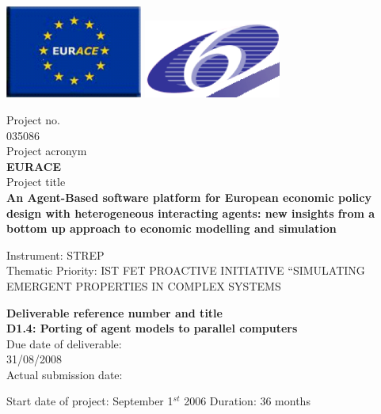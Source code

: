 \documentclass[a4paper,11pt]{article}
\begin{document}
\thispagestyle{empty}

\vspace{\baselineskip}
\includegraphics[width=45mm]{EURACE-logo.png}		
\hfill
\includegraphics[width=45mm]{FW6-logo.png}

\begin{center}
Project no.\\
035086\\
Project acronym\\
{\bf EURACE}\\
Project title\\
{\bf An Agent-Based software platform for European economic policy design with heterogeneous interacting agents: new insights from a bottom up approach to economic modelling and simulation}\\
\end{center}

\vspace*{\baselineskip}\noindent
Instrument: STREP\\[\baselineskip]
Thematic Priority: IST FET PROACTIVE INITIATIVE ``SIMULATING EMERGENT PROPERTIES IN COMPLEX SYSTEMS\\

\vspace*{2\baselineskip}
\begin{center}
{\bf
Deliverable reference number and title\\
D1.4: Porting of agent models to parallel computers\\
}
Due date of deliverable:\\
31/08/2008\\
Actual submission date:\\
\end{center}


\vspace*{\baselineskip}\noindent
{Start date of project: September 1$^{st}$} 2006 \hfill {Duration: 36 months}\\
\end{document}

